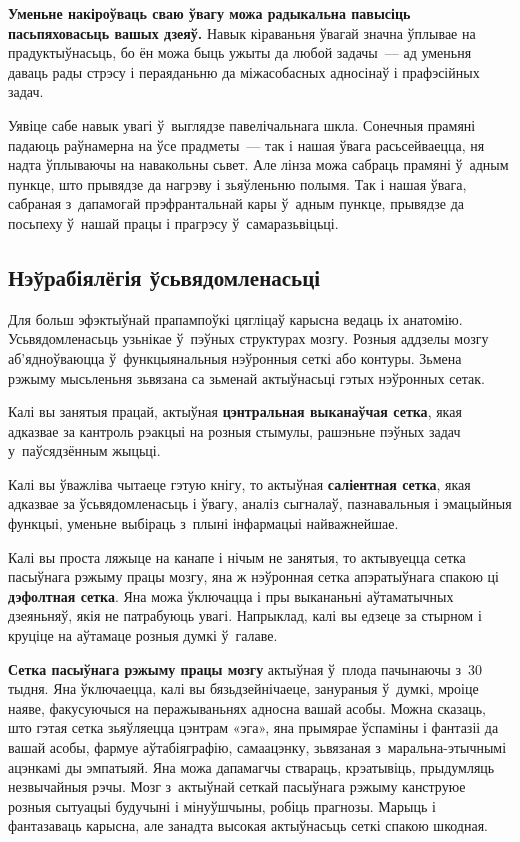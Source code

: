 \textbf{Уменьне накіроўваць сваю ўвагу можа радыкальна павысіць пасьпяховасьць вашых дзеяў.} Навык кіраваньня ўвагай значна ўплывае на прадуктыўнасьць, бо ён можа быць ужыты да любой задачы~--- ад уменьня даваць рады стрэсу і пераяданьню да міжасобасных адносінаў і прафэсійных задач.

Уявіце сабе навык увагі ў~выглядзе павелічальнага шкла. Сонечныя прамяні падаюць раўнамерна на ўсе прадметы~--- так і нашая ўвага расьсейваецца, ня надта ўплываючы на навакольны сьвет. Але лінза можа сабраць прамяні ў~адным пункце, што прывядзе да нагрэву і зьяўленьню полымя. Так і нашая ўвага, сабраная з~дапамогай прэфрантальнай кары ў~адным пункце, прывядзе да посьпеху ў~нашай працы і прагрэсу ў~самаразьвіцьці.

\subsection*{Нэўрабіялёгія ўсьвядомленасьці}

Для больш эфэктыўнай прапампоўкі цягліцаў карысна ведаць іх анатомію. Усьвядомленасьць узьнікае ў~пэўных структурах мозгу. Розныя аддзелы мозгу аб'ядноўваюцца ў~функцыянальныя нэўронныя сеткі або контуры. Зьмена рэжыму мысьленьня зьвязана са зьменай актыўнасьці гэтых нэўронных сетак.

Калі вы занятыя працай, актыўная \textbf{цэнтральная выканаўчая сетка}, якая адказвае за кантроль рэакцыі на розныя стымулы, рашэньне пэўных задач у~паўсядзённым жыцьці.

Калі вы ўважліва чытаеце гэтую кнігу, то актыўная \textbf{саліентная сетка}, якая адказвае за ўсьвядомленасьць і ўвагу, аналіз сыгналаў, пазнавальныя і эмацыйныя функцыі, уменьне выбіраць з~плыні інфармацыі найважнейшае.

Калі вы проста ляжыце на канапе і нічым не занятыя, то актывуецца сетка пасыўнага рэжыму працы мозгу, яна ж нэўронная сетка апэратыўнага спакою ці \textbf{дэфолтная сетка}. Яна можа ўключацца і пры выкананьні аўтаматычных дзеяньняў, якія не патрабуюць увагі. Напрыклад, калі вы едзеце за стырном і круціце на аўтамаце розныя думкі ў~галаве.

\textbf{Сетка пасыўнага рэжыму працы мозгу} актыўная ў~плода пачынаючы з~30 тыдня. Яна ўключаецца, калі вы бязьдзейнічаеце, занураныя ў~думкі, мроіце наяве, факусуючыся на перажываньнях адносна вашай асобы. Можна сказаць, што гэтая сетка зьяўляецца цэнтрам «эга», яна прымярае ўспаміны і фантазіі да вашай асобы, фармуе аўтабіяграфію, самаацэнку, зьвязаная з~маральна-этычнымі ацэнкамі ды эмпатыяй. Яна можа дапамагчы ствараць, крэатывіць, прыдумляць незвычайныя рэчы. Мозг з~актыўнай сеткай пасыўнага рэжыму канструюе розныя сытуацыі будучыні і мінуўшчыны, робіць прагнозы. Марыць і фантазаваць карысна, але занадта высокая актыўнасьць сеткі спакою шкодная.

